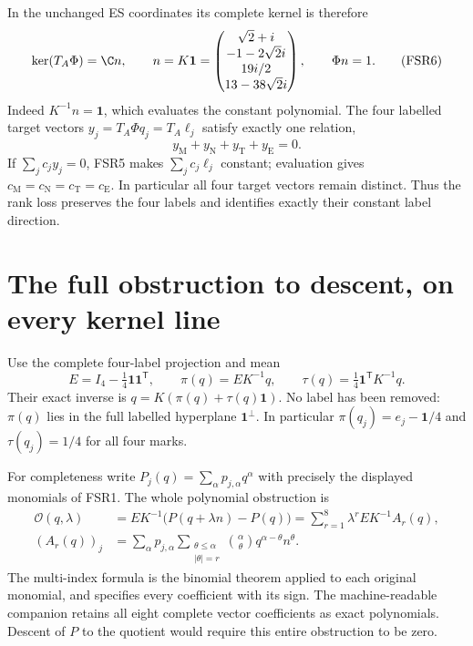 In the unchanged ES coordinates its complete kernel is therefore
\[
 \ker(T_A\Phi)=\C n,\qquad
 n=K\mathbf1=
 \begin{pmatrix}\sqrt2+i\\-1-2\sqrt2i\\19i/2\\13-38\sqrt2i\end{pmatrix},
 \qquad \Phi n=1.
 \tag{FSR6}
\]
Indeed $K^{-1}n=\mathbf1$, which evaluates the constant polynomial.
The four labelled target vectors $y_j=T_A\Phi q_j=T_A\ell_j$
satisfy exactly one relation,
\[
 y_{\mathrm M}+y_{\mathrm N}+y_{\mathrm T}+y_{\mathrm E}=0.
 \tag{FSR7}
\]
If $\sum_jc_jy_j=0$, FSR5 makes $\sum_jc_j\ell_j$ constant;
evaluation gives $c_{\mathrm M}=c_{\mathrm N}=c_{\mathrm T}=c_{\mathrm E}$.
In particular all four target vectors remain distinct. Thus the
rank loss preserves the four labels and identifies exactly their
constant label direction.

\section{The full obstruction to descent, on every kernel line}
Use the complete four-label projection and mean
\[
 E=I_4-\tfrac14\mathbf1\mathbf1^{\mathsf T},\qquad
 \pi(q)=EK^{-1}q,\qquad
 \tau(q)=\tfrac14\mathbf1^{\mathsf T}K^{-1}q.
 \tag{FSR8}
\]
Their exact inverse is $q=K(\pi(q)+\tau(q)\mathbf1)$.
No label has been removed: $\pi(q)$ lies in the full labelled
hyperplane $\mathbf1^\perp$. In particular
$\pi(q_j)=e_j-\mathbf1/4$ and $\tau(q_j)=1/4$ for all four marks.

For completeness write $P_j(q)=\sum_\alpha p_{j,\alpha}q^\alpha$
with precisely the displayed monomials of FSR1. The whole
polynomial obstruction is
\[
\begin{split}
 \mathcal O(q,\lambda)&=EK^{-1}\bigl(P(q+\lambda n)-P(q)\bigr)
                  =\sum_{r=1}^8\lambda^r EK^{-1}A_r(q),\\
 (A_r(q))_j&=\sum_\alpha p_{j,\alpha}
       \sum_{\substack{\theta\le\alpha\\|\theta|=r}}
           \binom\alpha\theta q^{\alpha-\theta}n^\theta .
\end{split}\tag{FSR9}
\]
The multi-index formula is the binomial theorem applied to each
original monomial, and specifies every coefficient with its sign.
The machine-readable companion retains all eight complete vector
coefficients as exact polynomials. Descent of $P$ to the quotient
would require this entire obstruction to be zero.

